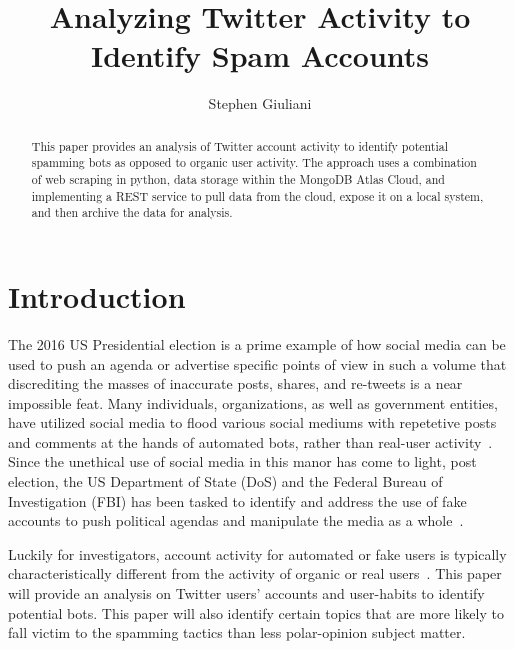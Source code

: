 
\title{Analyzing Twitter Activity to Identify Spam Accounts}


\author{Stephen Giuliani}

\renewcommand{\shortauthors}{S. Giuliani}


\begin{abstract}
  This paper provides an analysis of Twitter account activity to
  identify potential spamming bots as opposed to organic user
  activity. The approach uses a combination of web scraping in python,
  data storage within the MongoDB Atlas Cloud, and implementing a REST
  service to pull data from the cloud, expose it on a local system,
  and then archive the data for analysis.
\end{abstract}



\maketitle

\section{Introduction}

The 2016 US Presidential election is a prime example of how social media can be
used to push an agenda or advertise specific points of view in such a volume
that discrediting the masses of inaccurate posts, shares, and re-tweets is a
near impossible feat. Many individuals, organizations, as well as government
entities, have utilized social media to flood various social mediums with
repetetive posts and comments at the hands of automated bots, rather than
real-user activity~\cite{WPostTwitterBots}. Since the unethical use of social
media in this manor has come to light, post election, the US Department of
State (DoS) and the Federal Bureau of Investigation (FBI) has been tasked to
identify and address the use of fake accounts to push political agendas and
manipulate the media as a whole~\cite{FBISocialMediaInvestigation}.

Luckily for investigators, account activity for automated or fake users is
typically characteristically different from the activity of organic or real
users~\cite{BDSTwitterBots}. This paper will provide an analysis on Twitter
users' accounts and user-habits to identify potential bots. This paper will
also identify certain topics that are more likely to fall victim to the
spamming tactics than less polar-opinion subject matter.

